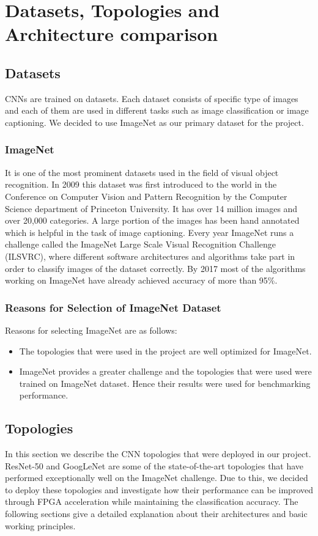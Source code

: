 \chapter{Datasets, Topologies and Architecture comparison}\label{chp:DataTopoArch}

\section{Datasets}
CNNs are trained on datasets. Each dataset consists of specific type of images and each of them are used in different tasks such as image classification or image captioning. We decided to use ImageNet as our primary dataset for the project.

\subsection{ImageNet}
It is one of the most prominent datasets used in the field of visual object recognition. In 2009 this dataset was first introduced to the world in the Conference on Computer Vision and Pattern Recognition by the Computer Science department of  Princeton University. It has over 14 million images and over 20,000 categories. A large portion of the images has been hand annotated which is helpful in the task of image captioning. Every year ImageNet runs a challenge called the ImageNet Large Scale Visual Recognition Challenge (ILSVRC), where different software architectures and algorithms take part in order to classify images of the dataset correctly. By 2017 most of the algorithms working on ImageNet have already achieved accuracy of more than 95\%.


\subsection{ Reasons for Selection of ImageNet Dataset}
Reasons for selecting ImageNet are as follows:
\begin{itemize}
    \item The topologies that were used in the project are well optimized for ImageNet. 
    \item ImageNet provides a greater challenge and the topologies that were used were trained on ImageNet dataset. Hence their results were  used for benchmarking performance.
\end{itemize}
\section{Topologies}
In this section we describe the CNN topologies that were deployed in our project. ResNet-50 and GoogLeNet are some of the state-of-the-art topologies that have performed exceptionally well on the ImageNet challenge. Due to this, we decided to deploy these topologies and investigate how their performance can be improved through FPGA acceleration while maintaining the classification accuracy. The following sections give a detailed explanation about their architectures and basic working principles.

